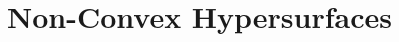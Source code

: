 \documentclass[12pt,ignorenonframes]{beamer}
\theoremstyle{plain}
\numberwithin{equation}{section}
\theoremstyle{remark}
\newcommand{\R}{\ensuremath{\mathbb{R}}}
\newcommand{\W}{\mathcal{W}}
\newcommand{\pd}{\partial}
\def\bann #1\eann {\begin{align*} #1\end{align*}}
\def\bi #1\ei {\begin{itemize} #1\end{itemize}}
\def\bf #1\ef {\begin{frame}<presentation> #1\end{frame}}
\begin{document}




\section{Non-Convex Hypersurfaces}
\end{document}
